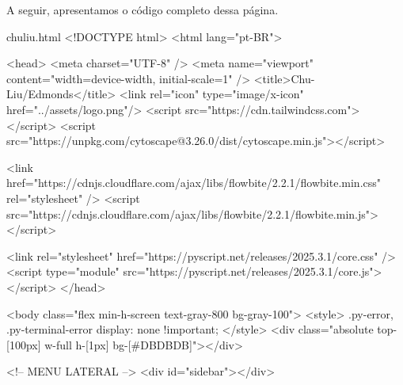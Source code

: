 \documentclass[12pt,a4paper]{article}
\begin{document}
A seguir, apresentamos o código completo dessa página.

\begin{htmlbox}{chuliu.html}
<!DOCTYPE html>
<html lang="pt-BR">

<head>
    <meta charset="UTF-8" />
    <meta name="viewport" content="width=device-width, initial-scale=1" />
    <title>Chu-Liu/Edmonds</title>
    <link rel="icon" type="image/x-icon" href="../assets/logo.png"/>
    <script src="https://cdn.tailwindcss.com"></script>
    <script src="https://unpkg.com/cytoscape@3.26.0/dist/cytoscape.min.js"></script>
    
    <link href="https://cdnjs.cloudflare.com/ajax/libs/flowbite/2.2.1/flowbite.min.css" rel="stylesheet" />
    <script src="https://cdnjs.cloudflare.com/ajax/libs/flowbite/2.2.1/flowbite.min.js"></script>

    <link rel="stylesheet" href="https://pyscript.net/releases/2025.3.1/core.css" />
    <script type="module" src="https://pyscript.net/releases/2025.3.1/core.js"></script>
</head>

<body class="flex min-h-screen text-gray-800 bg-gray-100">
    <style>
        .py-error, .py-terminal-error {
            display: none !important;
        }
    </style>
    <div class="absolute top-[100px] w-full h-[1px] bg-[#DBDBDB]"></div>

    <!-- MENU LATERAL -->
    <div id="sidebar"></div>


\end{htmlbox}
\end{document}
